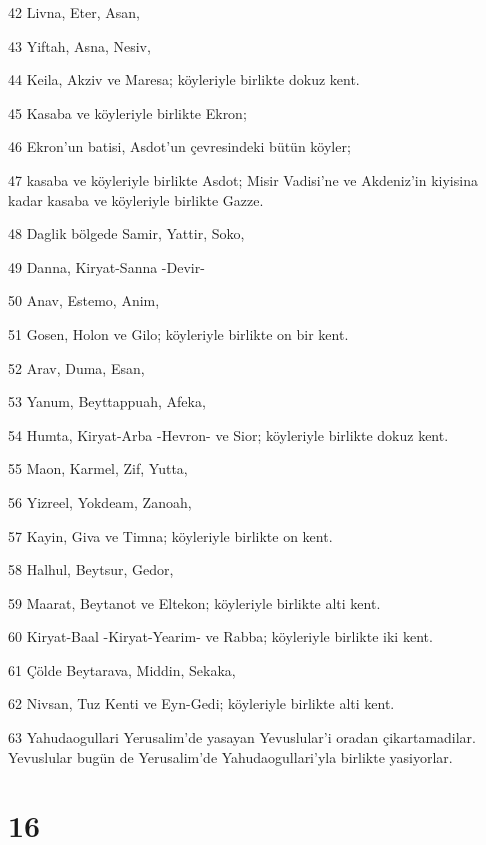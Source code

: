\par 42 Livna, Eter, Asan,
\par 43 Yiftah, Asna, Nesiv,
\par 44 Keila, Akziv ve Maresa; köyleriyle birlikte dokuz kent.
\par 45 Kasaba ve köyleriyle birlikte Ekron;
\par 46 Ekron'un batisi, Asdot'un çevresindeki bütün köyler;
\par 47 kasaba ve köyleriyle birlikte Asdot; Misir Vadisi'ne ve Akdeniz'in kiyisina kadar kasaba ve köyleriyle birlikte Gazze.
\par 48 Daglik bölgede Samir, Yattir, Soko,
\par 49 Danna, Kiryat-Sanna -Devir-
\par 50 Anav, Estemo, Anim,
\par 51 Gosen, Holon ve Gilo; köyleriyle birlikte on bir kent.
\par 52 Arav, Duma, Esan,
\par 53 Yanum, Beyttappuah, Afeka,
\par 54 Humta, Kiryat-Arba -Hevron- ve Sior; köyleriyle birlikte dokuz kent.
\par 55 Maon, Karmel, Zif, Yutta,
\par 56 Yizreel, Yokdeam, Zanoah,
\par 57 Kayin, Giva ve Timna; köyleriyle birlikte on kent.
\par 58 Halhul, Beytsur, Gedor,
\par 59 Maarat, Beytanot ve Eltekon; köyleriyle birlikte alti kent.
\par 60 Kiryat-Baal -Kiryat-Yearim- ve Rabba; köyleriyle birlikte iki kent.
\par 61 Çölde Beytarava, Middin, Sekaka,
\par 62 Nivsan, Tuz Kenti ve Eyn-Gedi; köyleriyle birlikte alti kent.
\par 63 Yahudaogullari Yerusalim'de yasayan Yevuslular'i oradan çikartamadilar. Yevuslular bugün de Yerusalim'de Yahudaogullari'yla birlikte yasiyorlar.

\chapter{16}

